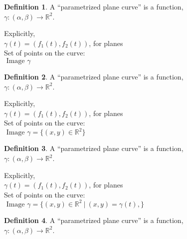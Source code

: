 \documentclass[twocolumn,20pt,fleqn]{extarticle}
\theoremstyle{plain}
\theoremstyle{definition}
\newtheorem*{definition}{Definition}
\theoremstyle{remark}
\begin{document}
\clearpage




\begin{definition}
  A  ``parametrized plane curve''  is a  function,\\ $\gamma  : (\alpha, \beta) \to \mathbb{R}^2$.
\end{definition}

Explicitly,\\
$\gamma(t) = (f_1(t), f_2(t))$, for planes\\

Set of points on the curve:\\  $\textrm{ Image } \gamma $


\clearpage




\begin{definition}
  A  ``parametrized plane curve''  is a  function,\\ $\gamma  : (\alpha, \beta) \to \mathbb{R}^2$.
\end{definition}

Explicitly,\\
$\gamma(t) = (f_1(t), f_2(t))$, for planes\\

Set of points on the curve:\\  $\textrm{ Image } \gamma = \{(x,y) \in \mathbb{R}^2\}$


\clearpage




\begin{definition}
  A  ``parametrized plane curve''  is a  function,\\ $\gamma  : (\alpha, \beta) \to \mathbb{R}^2$.
\end{definition}

Explicitly,\\
$\gamma(t) = (f_1(t), f_2(t))$, for planes\\

Set of points on the curve:\\  $\textrm{ Image } \gamma = \{(x,y) \in \mathbb{R}^2 \ |\ (x,y) = \gamma(t),\}$


\clearpage




\begin{definition}
  A  ``parametrized plane curve''  is a  function,\\ $\gamma  : (\alpha, \beta) \to \mathbb{R}^2$.
\end{definition}
\end{document}

